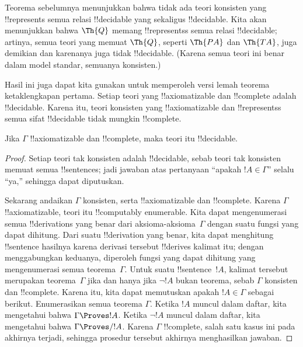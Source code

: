 \documentclass[../../../include/open-logic-section]{subfiles}
\begin{document}
\begin{explain}
Teorema sebelumnya menunjukkan bahwa tidak ada teori konsisten yang
!!{represents} semua relasi !!{decidable} yang sekaligus !!{decidable}.
Kita akan menunjukkan bahwa $\Th{Q}$ memang !!{represents}s semua relasi
!!{decidable}; artinya, semua teori yang memuat $\Th{Q}$, seperti $\Th{PA}$
dan $\Th{TA}$, juga demikian dan karenanya juga tidak !!{decidable}.
(Karena semua teori ini benar dalam model standar, semuanya konsisten.)

Hasil ini juga dapat kita gunakan untuk memperoleh versi lemah teorema
ketaklengkapan pertama. Setiap teori yang !!{axiomatizable} dan !!{complete}
adalah !!{decidable}. Karena itu, teori konsisten yang !!{axiomatizable} dan
!!{represents}s semua sifat !!{decidable} tidak mungkin !!{complete}.
\end{explain}

\begin{thm}
Jika $\Gamma$ !!{axiomatizable} dan !!{complete}, maka teori itu
!!{decidable}.
\end{thm}

\begin{proof}
Setiap teori tak konsisten adalah !!{decidable}, sebab teori tak konsisten
memuat semua !!{sentence}s; jadi jawaban atas pertanyaan ``apakah $!A \in
\Gamma$'' selalu ``ya,'' sehingga dapat diputuskan.

Sekarang andaikan $\Gamma$ konsisten, serta !!{axiomatizable} dan
!!{complete}. Karena $\Gamma$ !!{axiomatizable}, teori itu
!!{computably enumerable}. Kita dapat mengenumerasi semua !!{derivation}s
yang benar dari aksioma-aksioma~$\Gamma$ dengan suatu fungsi yang dapat
dihitung. Dari suatu !!{derivation} yang benar, kita dapat menghitung
!!{sentence} hasilnya karena derivasi tersebut !!{derive}s kalimat itu;
dengan menggabungkan keduanya, diperoleh fungsi yang
dapat dihitung yang mengenumerasi semua teorema~$\Gamma$. Untuk suatu
!!{sentence}~$!A$, kalimat tersebut merupakan teorema~$\Gamma$ jika dan
hanya jika $\lnot !A$ bukan teorema,
sebab $\Gamma$ konsisten dan !!{complete}. Karena itu, kita dapat memutuskan
apakah $!A \in \Gamma$ sebagai berikut. Enumerasikan semua teorema
$\Gamma$. Ketika $!A$ muncul dalam daftar, kita mengetahui bahwa $\Gamma
\Proves !A$. Ketika $\lnot !A$ muncul dalam daftar, kita mengetahui bahwa
$\Gamma \Proves/ !A$. Karena $\Gamma$ !!{complete}, salah satu kasus ini
pada akhirnya terjadi, sehingga prosedur tersebut akhirnya menghasilkan
jawaban.
\end{proof}
\end{document}
